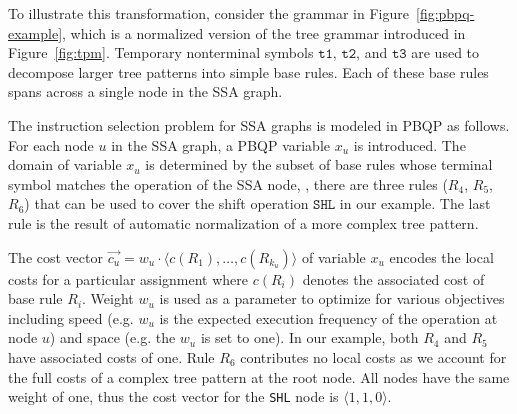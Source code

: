 To illustrate this transformation, consider the grammar in
Figure~\ref{fig:pbpq-example}, which is a normalized version of the
tree grammar introduced in Figure~\ref{fig:tpm}. Temporary nonterminal
symbols $\texttt{t1}$, $\texttt{t2}$, and $\texttt{t3}$ are used to
decompose larger tree patterns into simple base rules. Each of these
base rules spans across a single node in the SSA graph.

The instruction selection problem for SSA graphs is modeled in PBQP as
follows. For each node $u$ in the SSA graph, a PBQP variable $x_u$ is
introduced. The domain of variable $x_u$ is determined by the subset
of base rules whose terminal symbol matches the operation of the SSA
node, \eg, there are three rules ($R_4$, $R_5$, $R_6$) that can be
used to cover the shift operation $\texttt{SHL}$ in our example. The
last rule is the result of automatic normalization of a more complex
tree pattern.

The cost vector $\vec{c_u}= w_u \cdot \langle c(R_1), \dots,
c(R_{k_u}) \rangle$ of variable $x_u$ encodes the local costs for a
particular assignment where $c(R_i)$ denotes the associated cost of
base rule $R_i$. Weight $w_u$ is used as a parameter to optimize for
various objectives including speed (e.g. $w_u$ is the expected
execution frequency of the operation at node $u$) and space (e.g. the
$w_u$ is set to one). In our example, both $R_4$ and $R_5$ have
associated costs of one. Rule $R_6$ contributes no local costs as we
account for the full costs of a complex tree pattern at the root
node. All nodes have the same weight of one, thus the cost vector for
the \texttt{SHL} node is $\langle1, 1, 0 \rangle$.

